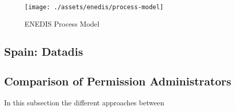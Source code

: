 \begin{figure}[h]
    \texttt{[image: ./assets/enedis/process-model]}
    \caption{ENEDIS Process Model}
    \label{fig:enedis-process-model}
\end{figure}

\subsection{Spain: Datadis}\label{subsec:spain:-datadis}

\subsection{Comparison of Permission Administrators}\label{subsec:comparison-of-permission-administrators}
In this subsection the different approaches between 
